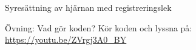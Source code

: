 \ifkompendium\else
\begin{SlideExtra}{Syresättning av hjärnan med registreringslek}\SlideFontTiny

\vspace{-0.65em}
Övning: Vad gör koden?
%
\vspace{-0.5em}Kör koden och lyssna på: \href{https://youtu.be/ZVrgj3A0_BY}{https://youtu.be/ZVrgj3A0\_BY}
\end{SlideExtra}
\fi